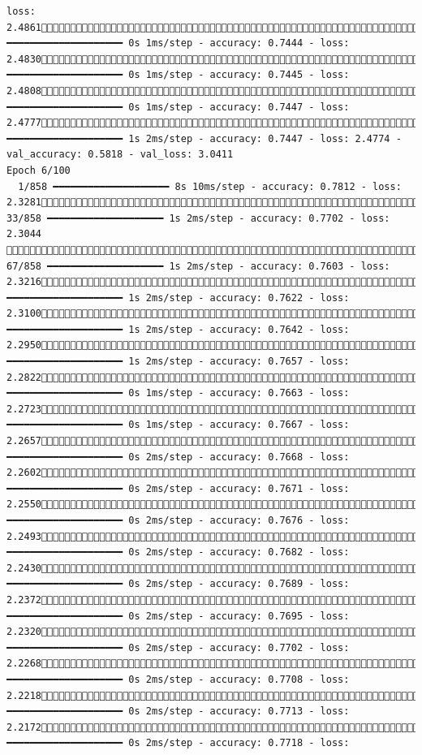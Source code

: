 \documentclass[
  letterpaper,
  DIV=11,
  numbers=noendperiod]{scrartcl}
\begin{document}
\begin{verbatim}
loss: 2.4861804/858 ━━━━━━━━━━━━━━━━━━━━ 0s 1ms/step - accuracy: 0.7444 - loss: 2.4830825/858 ━━━━━━━━━━━━━━━━━━━━ 0s 1ms/step - accuracy: 0.7445 - loss: 2.4808856/858 ━━━━━━━━━━━━━━━━━━━━ 0s 1ms/step - accuracy: 0.7447 - loss: 2.4777858/858 ━━━━━━━━━━━━━━━━━━━━ 1s 2ms/step - accuracy: 0.7447 - loss: 2.4774 - val_accuracy: 0.5818 - val_loss: 3.0411
Epoch 6/100
  1/858 ━━━━━━━━━━━━━━━━━━━━ 8s 10ms/step - accuracy: 0.7812 - loss: 2.3281 33/858 ━━━━━━━━━━━━━━━━━━━━ 1s 2ms/step - accuracy: 0.7702 - loss: 2.3044  67/858 ━━━━━━━━━━━━━━━━━━━━ 1s 2ms/step - accuracy: 0.7603 - loss: 2.3216101/858 ━━━━━━━━━━━━━━━━━━━━ 1s 2ms/step - accuracy: 0.7622 - loss: 2.3100136/858 ━━━━━━━━━━━━━━━━━━━━ 1s 2ms/step - accuracy: 0.7642 - loss: 2.2950168/858 ━━━━━━━━━━━━━━━━━━━━ 1s 2ms/step - accuracy: 0.7657 - loss: 2.2822206/858 ━━━━━━━━━━━━━━━━━━━━ 0s 1ms/step - accuracy: 0.7663 - loss: 2.2723239/858 ━━━━━━━━━━━━━━━━━━━━ 0s 1ms/step - accuracy: 0.7667 - loss: 2.2657272/858 ━━━━━━━━━━━━━━━━━━━━ 0s 2ms/step - accuracy: 0.7668 - loss: 2.2602304/858 ━━━━━━━━━━━━━━━━━━━━ 0s 2ms/step - accuracy: 0.7671 - loss: 2.2550337/858 ━━━━━━━━━━━━━━━━━━━━ 0s 2ms/step - accuracy: 0.7676 - loss: 2.2493371/858 ━━━━━━━━━━━━━━━━━━━━ 0s 2ms/step - accuracy: 0.7682 - loss: 2.2430404/858 ━━━━━━━━━━━━━━━━━━━━ 0s 2ms/step - accuracy: 0.7689 - loss: 2.2372436/858 ━━━━━━━━━━━━━━━━━━━━ 0s 2ms/step - accuracy: 0.7695 - loss: 2.2320468/858 ━━━━━━━━━━━━━━━━━━━━ 0s 2ms/step - accuracy: 0.7702 - loss: 2.2268501/858 ━━━━━━━━━━━━━━━━━━━━ 0s 2ms/step - accuracy: 0.7708 - loss: 2.2218534/858 ━━━━━━━━━━━━━━━━━━━━ 0s 2ms/step - accuracy: 0.7713 - loss: 2.2172568/858 ━━━━━━━━━━━━━━━━━━━━ 0s 2ms/step - accuracy: 0.7718 - loss: 
\end{verbatim}
\end{document}
